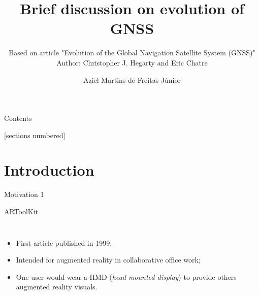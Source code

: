 \documentclass[10pt]{beamer}
\title{Brief discussion on evolution of GNSS}
\subtitle{Based on article "Evolution of the Global Navigation Satellite System (GNSS)"\\
Author: Christopher J. Hegarty  and Eric Chatre}
\date{}
\author{Aziel Martins de Freitas Júnior}
\institute{SENAI CIMATEC}
\begin{document}
\maketitle


\begin{frame}{Contents}

  [sections numbered]
  \tableofcontents%

\end{frame}

\section[Introduction]{Introduction}


\begin{frame}[fragile]{Motivation}
1
\end{frame}


\begin{frame}[fragile]{ARToolKit}
  \begin{columns}
    \begin{itemize}
      \item First article published in 1999;
      \item Intended for augmented reality in collaborative office work;
      \item One user would wear a HMD (\emph{head mounted display}) to provide others augmented reality visuals.
    \end{itemize}
  \end{columns}
\end{frame}
\end{document}
